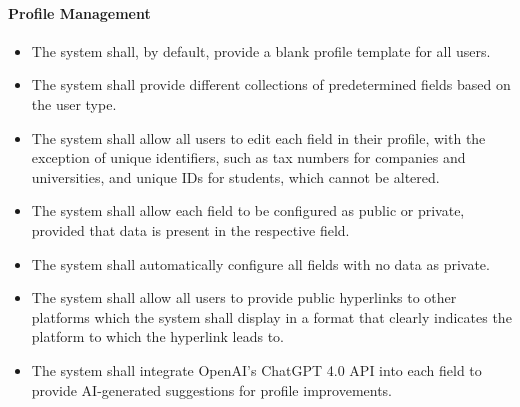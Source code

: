 \paragraph{Profile Management}
\begin{itemize}[label={[\textbf{FR}]}, align=left, leftmargin=*]
    \item {} The system shall, by default, provide a blank profile template for all users.
    \item {} The system shall provide different collections of predetermined fields based on the user type.
    \item {} The system shall allow all users to edit each field in their profile, with the exception of unique identifiers, such as tax numbers for companies and universities, and unique IDs for students, which cannot be altered.
    \item {} The system shall allow each field to be configured as public or private, provided that data is present in the respective field.
    \item {} The system shall automatically configure all fields with no data as private.
    \item {} The system shall allow all users to provide public hyperlinks to other platforms which the system shall display in a format that clearly indicates the platform to which the hyperlink leads to.
    \item {} The system shall integrate OpenAI's ChatGPT 4.0 API into each field to provide AI-generated suggestions for profile improvements.
\end{itemize}



